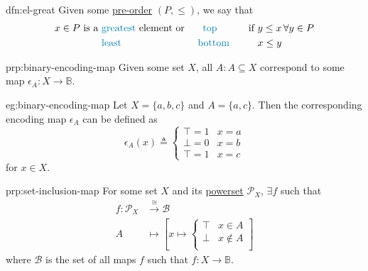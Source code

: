 \begin{dfn}{dfn:el-great}
    Given some \hyperref[dfn:pre-order]{pre-order} \( (P, \leq) \), we say that
    \begin{alignat*}{3}
        x \in P \text{ is a }
        &\text{\textcolor{dfn-color}{greatest}} \text{ element or }
        &\text{\textcolor{dfn-color}{top}} \hspace{1cm} \text{ if }
        &y \leq x \, \forall y \in P \\
        &\text{\textcolor{dfn-color}{least}} &\text{\textcolor{dfn-color}{bottom}} \hspace{1cm}
        &x \leq y
    \end{alignat*}
\end{dfn}

\begin{prp}{prp:binary-encoding-map}
    Given some set \( X \), all \( A : A \subseteq X \) correspond to some map \( \epsilon_{A} : X \to \mathbb{B} \).
\end{prp}

\begin{eg}{eg:binary-encoding-map}
    Let \( X = \{ a, b, c \} \) and \( A = \{ a, c \} \).
    Then the corresponding encoding map \( \epsilon_{A} \) can be defined as
    \[
        \epsilon_{A}(x) \triangleq
        \begin{cases}
            \top = 1 & x = a \\
            \bot = 0 & x = b \\
            \top = 1 & x = c
        \end{cases}
    \]
    for \( x \in X \).
\end{eg}

\begin{prp}{prp:set-inclusion-map}
    For some set \( X \) and its \hyperref[eg:powerset]{powerset} \( \mathcal{P}_{X} \), \( \exists f \) such that
    \begin{align*}
        f : \mathcal{P}_{X} &\xrightarrow{\cong} \mathcal{B} \\
        A &\mapsto
        \left [
            x \mapsto
            \begin{cases}
                \top & x \in A \\
                \bot & x \notin A \\
            \end{cases}
        \right]
    \end{align*}
    where \( \mathcal{B} \) is the set of all maps \( f \) such that \( f : X \to \mathbb{B} \).
\end{prp}

